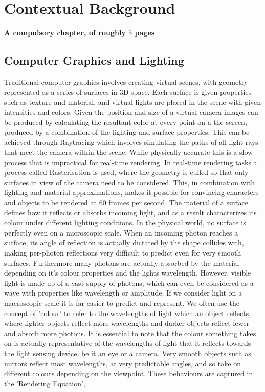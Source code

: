 \documentclass[ %
                    author={Gavin Parker},
                supervisor={Dr. Neill Campbell},
                    degree={MEng},
                     title={Deep Siamese Networks for Illumination Estimation from Stereo Images},
                  subtitle={},
                      type={research},
                      year={2018} ]{dissertation}
\begin{document}
\mainmatter


\chapter{Contextual Background}
\label{chap:context}

{\bf A compulsory chapter,     of roughly $5$ pages}
\vspace{1cm} 
\section{Computer Graphics and Lighting}

\noindent
Traditional computer graphics involves creating virtual scenes, with geometry represented as a series of surfaces in 3D space. Each surface is given properties such as texture and material, and virtual lights are placed in the scene with given intensities and colors. Given the position and size of a virtual camera images can be produced by calculating the resultant color at every point on a the screen, produced by a combination of the lighting and surface properties. This can be achieved through Raytracing which involves simulating the paths of all light rays that meet the camera within the scene. While physically accurate this is a slow process that is impractical for real-time rendering. In real-time rendering tasks a process called Rasterisation is used, where the geometry is culled so that only surfaces in view of the camera need to be considered. This, in combination with lighting and material approximations, makes it possible for convincing characters and objects to be rendered at 60 frames per second.
The material of a surface defines how it reflects or absorbs incoming light, and as a result characterizes its colour under different lighting conditions. In the physical world, no surface is perfectly even on a microscopic scale. When an incoming photon reaches a surface, its angle of reflection is actually dictated by the shape collides with, making per-photon reflections very difficult to predict even for very smooth surfaces. Furthermore many photons are actually absorbed by the material depending on it's colour properties and the lights wavelength. However, visible light is made up of a vast supply of photons, which can even be considered as a wave with properties like wavelength or amplitude. If we consider light on a macroscopic scale it is far easier to predict and represent. We often use the concept of 'colour' to refer to the wavelengths of light which an object reflects, where lighter objects reflect more wavelengths and darker objects reflect fewer and absorb more photons. It is essential to note that the colour something takes on is actually representative of the wavelengths of light that it reflects towards the light sensing device, be it an eye or a camera. Very smooth objects such as mirrors reflect most wavelengths, at very predictable angles, and so take on different colours depending on the viewpoint. These behaviours are captured in the 'Rendering Equation', 
\end{document}

